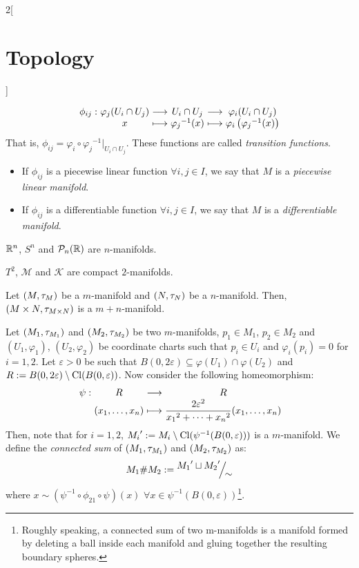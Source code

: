 \documentclass[../../../main.tex]{subfiles}
\begin{document}
\begin{multicols}{2}[\section{Topology}]
\begin{definition}
$$      \begin{array}{r@{\hspace{0.5\tabcolsep}}c@{\hspace{0.5\tabcolsep}}c@{\hspace{0.5\tabcolsep}}c@{\hspace{0.5\tabcolsep}}c@{\hspace{0.5\tabcolsep}}c}
        \phi_{ij}: & \varphi_j(U_i\cap U_j) & \longrightarrow & U_i\cap U_j         & \longrightarrow & \varphi_i(U_i\cap U_j)                    \\
                   & x                      & \longmapsto     & {\varphi_j}^{-1}(x) & \longmapsto     & \varphi_i\left({\varphi_j}^{-1}(x)\right)
      \end{array}$$
    That is, $\phi_{ij}=\varphi_i\circ{\varphi_j}^{-1}|_{U_i\cap U_j}$. These functions are called \emph{transition functions}.
    \begin{itemize}
      \item If $\phi_{ij}$ is a piecewise linear function $\forall i,j\in I$, we say that $M$ is a \emph{piecewise linear manifold}.
      \item If $\phi_{ij}$ is a differentiable function $\forall i,j\in I$, we say that $M$ is a \emph{differentiable manifold}.
    \end{itemize}
  \end{definition}
  \begin{prop}
    $\mathbb{R}^n$, $S^n$ and $\mathcal{P}_n(\mathbb{R})$ are $n$-manifolds.
  \end{prop}
  \begin{prop}
    $T^2$, $\mathcal{M}$ and $\mathcal{K}$ are compact $2$-manifolds.
  \end{prop}
  \begin{prop}
    Let $(M,\tau_M)$ be a $m$-manifold and $(N,\tau_N)$ be a $n$-manifold. Then, $(M\times N,\tau_{M\times N})$ is a $m+n$-manifold.
  \end{prop}
  \begin{definition}
    Let $(M_1,\tau_{M_1})$ and $(M_2,\tau_{M_2})$ be two $m$-manifolds, $p_1\in M_1$, $p_2\in M_2$ and $(U_1,\varphi_1)$, $(U_2,\varphi_2)$ be coordinate charts such that $p_i\in U_i$ and $\varphi_i(p_i)=0$ for $i=1,2$. Let $\varepsilon>0$ be such that $B(0,2\varepsilon)\subseteq \varphi(U_1)\cap \varphi(U_2)$ and $R:=B(0,2\varepsilon)\setminus\operatorname{Cl} (B(0,\varepsilon))$. Now consider the following homeomorphism:
    $$\function{\psi}{R}{R}{(x_1,\ldots,x_n)}{\displaystyle\frac{2\varepsilon^2}{{x_1}^2+\cdots+{x_n}^2}(x_1,\ldots,x_n)}$$
    Then, note that for $i=1,2$, ${M_i}':=M_i\setminus\operatorname{Cl}(\psi^{-1}(B(0,\varepsilon)))$ is a $m$-manifold. We define the \emph{connected sum} of $(M_1,\tau_{M_1})$ and $(M_2,\tau_{M_2})$ as: $$M_1\#M_2:=\quot{{M_1}'\sqcup{M_2}'}{\sim}$$
    where $x\sim (\psi^{-1}\circ\phi_{21}\circ\psi)(x)$ $\forall x\in \psi^{-1}(B(0,\varepsilon))$\footnote{Roughly speaking, a connected sum of two m-manifolds is a manifold formed by deleting a ball inside each manifold and gluing together the resulting boundary spheres.}.
  \end{definition}

\end{multicols}
\end{document}

